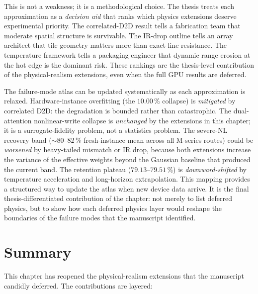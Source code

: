 This is not a weakness; it is a methodological choice.  The thesis treats each approximation as a \emph{decision aid} that ranks which physics extensions deserve experimental priority.  The correlated-D2D result tells a fabrication team that moderate spatial structure is survivable.  The IR-drop outline tells an array architect that tile geometry matters more than exact line resistance.  The temperature framework tells a packaging engineer that dynamic range erosion at the hot edge is the dominant risk.  These rankings are the thesis-level contribution of the physical-realism extensions, even when the full GPU results are deferred.

The failure-mode atlas can be updated systematically as each approximation is relaxed.  Hardware-instance overfitting (the $10.00\,\%$ collapse) is \emph{mitigated} by correlated D2D: the degradation is bounded rather than catastrophic.  The dual-attention nonlinear-write collapse is \emph{unchanged} by the extensions in this chapter; it is a surrogate-fidelity problem, not a statistics problem.  The severe-NL recovery band ($\sim$80--82\,\% fresh-instance mean across all M-series routes) could be \emph{worsened} by heavy-tailed mismatch or IR drop, because both extensions increase the variance of the effective weights beyond the Gaussian baseline that produced the current band.  The retention plateau ($79.13$--$79.51\,\%$) is \emph{downward-shifted} by temperature acceleration and long-horizon extrapolation.  This mapping provides a structured way to update the atlas when new device data arrive.  It is the final thesis-differentiated contribution of the chapter: not merely to list deferred physics, but to show how each deferred physics layer would reshape the boundaries of the failure modes that the manuscript identified.

\section{Summary}
\label{sec:pr-summary}

This chapter has reopened the physical-realism extensions that the manuscript candidly deferred.  The contributions are layered:

